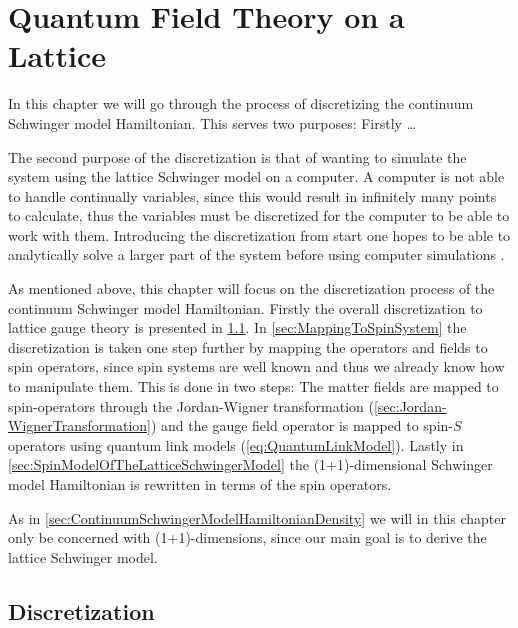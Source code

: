 \documentclass[../main.tex]{subfiles} %
\begin{document}
\chapter{Quantum Field Theory on a Lattice} \label{chap:LatticeQFT}

In this chapter we will go through the process of discretizing the continuum Schwinger model Hamiltonian. This serves two purposes: Firstly \ldots \lipsum[10]

The second purpose of the discretization is that of wanting to simulate the system using the lattice Schwinger model on a computer. A computer is not able to handle continually variables, since this would result in infinitely many points to calculate, thus the variables must be discretized for the computer to be able to work with them. Introducing the discretization from start one hopes to be able to analytically solve a larger part of the system before using computer simulations \cite{panyella_masterThesis_2019}.

As mentioned above, this chapter will focus on the discretization process of the continuum Schwinger model Hamiltonian. Firstly the overall discretization to lattice gauge theory is presented in \cref{sec:Discretization}. In \cref{sec:MappingToSpinSystem} the discretization is taken one step further by mapping the operators and fields to spin operators, since spin systems are well known and thus we already know how to manipulate them. This is done in two steps: The matter fields are mapped to spin-\half operators through the Jordan-Wigner transformation (\cref{sec:Jordan-WignerTransformation}) and the gauge field operator is mapped to spin-$S$ operators using quantum link models (\cref{eq:QuantumLinkModel}). Lastly in \cref{sec:SpinModelOfTheLatticeSchwingerModel} the (1+1)-dimensional Schwinger model Hamiltonian is rewritten in terms of the spin operators.

As in \cref{sec:ContinuumSchwingerModelHamiltonianDensity} we will in this chapter only be concerned with (1+1)-dimensions, since our main goal is to derive the lattice Schwinger model.




\section{Discretization} \label{sec:Discretization}
\end{document}
